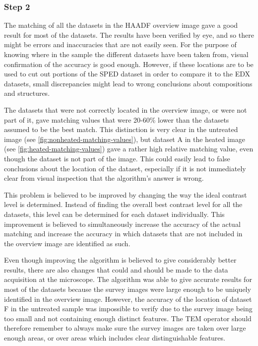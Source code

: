 \subsubsection{Step 2}

The matching of all the datasets in the HAADF overview image gave a good result for most of the datasets. The results have been verified by eye, and so there might be errors and inaccuracies that are not easily seen. For the purpose of knowing where in the sample the different datasets have been taken from, visual confirmation of the accuracy is good enough. However, if these locations are to be used to cut out portions of the SPED dataset in order to compare it to the EDX datasets, small discrepancies might lead to wrong conclusions about compositions and structures.

The datasets that were not correctly located in the overview image, or were not part of it, gave matching values that were 20-60\% lower than the datasets assumed to be the best match. This distinction is very clear in the untreated image (see \cref{fig:nonheated-matching-values}), but dataset A in the heated image (see \cref{fig:heated-matching-values}) gave a rather high relative matching value, even though the dataset is not part of the image. This could easily lead to false conclusions about the location of the dataset, especially if it is not immediately clear from visual inspection that the algorithm's answer is wrong.

This problem is believed to be improved by changing the way the ideal contrast level is determined. Instead of finding the overall best contrast level for all the datasets, this level can be determined for each dataset individually. This improvement is believed to simultaneously increase the accuracy of the actual matching and increase the accuracy in which datasets that are not included in the overview image are identified as such.

Even though improving the algorithm is believed to give considerably better results, there are also changes that could and should be made to the data acquisition at the microscope. The algorithm was able to give accurate results for most of the datasets because the survey images were large enough to be uniquely identified in the overview image. However, the accuracy of the location of dataset F in the untreated sample was impossible to verify due to the survey image being too small and not containing enough distinct features. The TEM operator should therefore remember to always make sure the survey images are taken over large enough areas, or over areas which includes clear distinguishable features.

